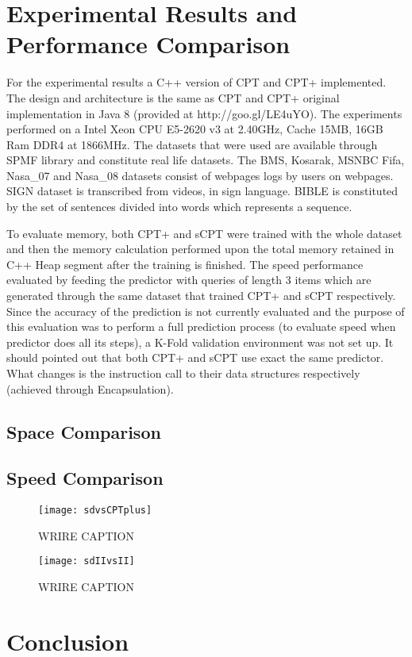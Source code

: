 \section{Experimental Results and Performance Comparison} \label{experimental}
For the experimental results a C++ version of CPT and CPT+ implemented. The design and architecture is the same as CPT and CPT+ original implementation in Java 8 (provided at http://goo.gl/LE4uYO). The experiments performed on a Intel Xeon CPU E5-2620 v3 at 2.40GHz, Cache 15MB, 16GB Ram DDR4 at 1866MHz. The datasets that were used are available through SPMF library \cite{spmf} and constitute real life datasets. The BMS, Kosarak, MSNBC Fifa, Nasa\_07 and Nasa\_08 datasets consist of webpages logs by users on webpages. SIGN dataset is transcribed from videos, in sign language. BIBLE is constituted by the set of sentences divided into words which represents a sequence. 
\par To evaluate memory, both CPT+ and sCPT were trained with the whole dataset and then the memory calculation performed upon the total memory retained in C++ Heap segment after the training is finished. The speed performance evaluated by feeding the predictor with queries of length 3 items which are generated through the same dataset that trained CPT+ and sCPT respectively. Since the accuracy of the prediction is not currently evaluated and the purpose of this evaluation was to perform a full prediction process (to evaluate speed when predictor does all its steps), a K-Fold \cite{Kohavi} validation environment was not set up. It should pointed out that both CPT+ and sCPT use exact the same predictor. What changes is the instruction call to their data structures respectively (achieved through Encapsulation).

\subsection*{Space Comparison}

\subsection*{Speed Comparison}

\begin{figure}[h]
    \centering
    \texttt{[image: sdvsCPTplus]}
    \caption{WRIRE CAPTION}
    \label{fig:sdvsCPTplus}
\end{figure}

\begin{figure}[h]
    \centering
    \texttt{[image: sdIIvsII]}
    \caption{WRIRE CAPTION}
    \label{fig:sdIIvsII}
\end{figure}

\section{Conclusion}


\newpage